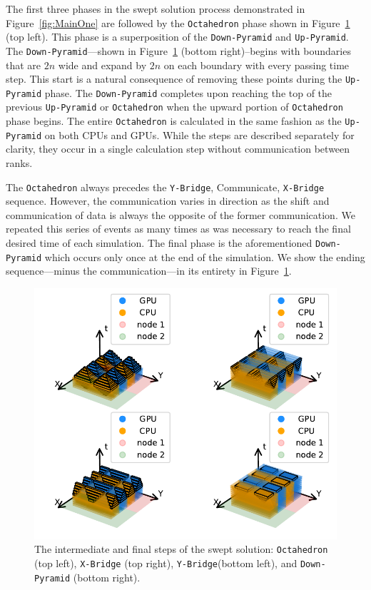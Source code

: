 \documentclass[preprints,article,accept,moreauthors,pdftex]{Definitions/mdpi}
\def\Up{\texttt{Up-Pyramid}}
\def\Down{\texttt{Down-Pyramid}}
\def\Oct{\texttt{Octahedron}}
\def\Xb{\texttt{X-Bridge}}
\def\Yb{\texttt{Y-Bridge}}
\newcommand\fs{0.7}
\begin{document}
\par
The first three phases in the swept solution process demonstrated in Figure~\ref{fig:MainOne} are followed by the \Oct{} phase shown in Figure~\ref{fig:MainTwo} (top left). This phase is a superposition of the \Down{} and \Up{}. The \Down{}---shown in Figure~\ref{fig:MainTwo} (bottom right)--begins with boundaries that are $2n$ wide and expand by $2n$ on each boundary with every passing time step. This start is a natural consequence of removing these points during the \Up{} phase. The \Down{} completes upon reaching the top of the previous \Up{} or \Oct{} when the upward portion of \Oct{} phase begins. The entire \Oct{} is calculated in the same fashion as the \Up{} on both CPUs and GPUs. While the steps are described separately for clarity, they occur in a single calculation step without communication between ranks. 

\par
The \Oct{} always precedes the \Yb{}, Communicate, \Xb{} sequence. However, the communication varies in direction as the shift and communication of data is always the opposite of the former communication. We repeated this series of events as many times as was necessary to reach the final desired time of each simulation. The final phase is the aforementioned \Down{} which occurs only once at the end of the simulation. We show the ending sequence---minus the communication---in its entirety in Figure~\ref{fig:MainTwo}. 


\begin{figure}[H]
    \begin{center}
        \includegraphics[scale=\fs, trim={1cm 0.6cm 0.25cm 0cm},clip]{figs/SubsPlot2.pdf}
    \end{center}
    \caption{The intermediate and final steps of the swept solution: \Oct{} (top left), \Xb{} (top right), \Yb (bottom left), and \Down{} (bottom right).}
    \label{fig:MainTwo}
\end{figure}
\end{document}
